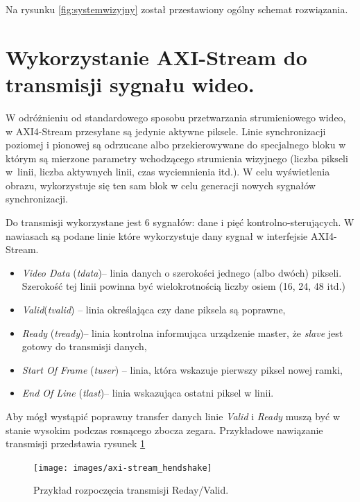 Na rysunku \ref{fig:systemwizyjny} został przestawiony ogólny schemat rozwiązania.
\section{Wykorzystanie AXI-Stream do transmisji sygnału wideo.} 
W odróżnieniu od standardowego sposobu przetwarzania strumieniowego wideo, w AXI4-Stream przesyłane są jedynie aktywne piksele. 
Linie synchronizacji poziomej i pionowej są odrzucane albo przekierowywane do specjalnego bloku w którym są mierzone parametry wchodzącego strumienia wizyjnego (liczba pikseli w~linii, liczba aktywnych linii, czas wyciemnienia itd.). 
W celu wyświetlenia obrazu, wykorzystuje się ten sam blok w celu generacji nowych sygnałów synchronizacji. 

Do transmisji wykorzystane jest 6 sygnałów: dane i pięć kontrolno-sterujących. W nawiasach są podane linie które wykorzystuje dany sygnał w interfejsie AXI4-Stream.
\begin{itemize}
\item \textit{Video Data} (\textit{tdata})-- linia danych o szerokości jednego (albo dwóch) pikseli. Szerokość tej linii powinna być wielokrotnością liczby osiem (16, 24, 48 itd.)
\item \textit{Valid}(\textit{tvalid}) -- linia określająca czy dane piksela są poprawne,
\item \textit{Ready} (\textit{tready})-- linia kontrolna informująca urządzenie master, że \textit{slave} jest gotowy do transmisji danych, %
\item \textit{Start Of Frame} (\textit{tuser}) -- linia, która wskazuje pierwszy piksel nowej ramki,
\item \textit{End Of Line} (\textit{tlast})-- linia wskazująca ostatni piksel w linii. %

\end{itemize}
Aby mógł wystąpić poprawny transfer danych linie \textit{Valid} i \textit{Ready} muszą być w stanie wysokim podczas rosnącego zbocza zegara. 
Przykładowe nawiązanie transmisji przedstawia rysunek \ref{fig:handshake}

\begin{figure}[h]
    \centering
    \texttt{[image: images/axi-stream\_hendshake]}
    \caption{Przykład rozpoczęcia transmisji Reday/Valid.}
    \label{fig:handshake}
\end{figure}

